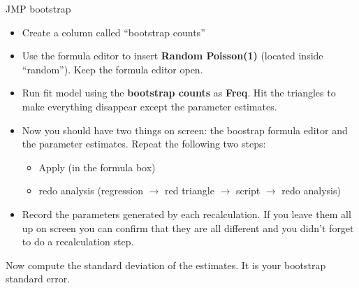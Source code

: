 \documentclass{article}
\begin{document}
JMP bootstrap
\begin{itemize}
\item Create a column called ``bootstrap counts''
\item Use the formula editor to insert {\bf Random Poisson(1)}
(located inside ``random'').  Keep the formula editor open.
\item Run fit model using the {\bf bootstrap counts} as {\bf Freq}.
Hit the triangles to make everything disappear except the parameter estimates.
\item Now you should have two things on screen: the boostrap formula
editor and the parameter estimates.  Repeat the following two steps:
\begin{itemize}
\item Apply (in the formula box)
\item redo analysis (regression $\rightarrow$ red triangle
$\rightarrow$ script $\rightarrow$ redo analysis)
\end{itemize}
\item Record the parameters generated by each recalculation.  If you
leave them all up on screen you can confirm that they are all
different and you didn't forget to do a recalculation step.
\end{itemize}
Now compute the standard deviation of the estimates.  It is your
bootstrap standard error.
\end{document}

